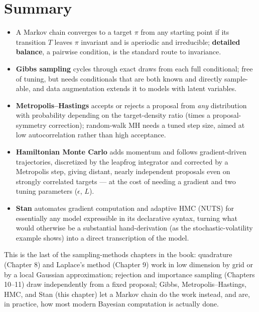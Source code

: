 \documentclass[
  letterpaper,
  DIV=11,
  numbers=noendperiod]{scrreprt}
\providecommand{\tightlist}{%
  \setlength{\itemsep}{0pt}\setlength{\parskip}{0pt}}
\begin{document}
\section{Summary}\label{summary-6}

\begin{itemize}
\tightlist
\item
  A Markov chain converges to a target \(\pi\) from any starting point
  if its transition \(T\) leaves \(\pi\) invariant and is aperiodic and
  irreducible; \textbf{detailed balance}, a pairwise condition, is the
  standard route to invariance.
\item
  \textbf{Gibbs sampling} cycles through exact draws from each full
  conditional; free of tuning, but needs conditionals that are both
  known and directly sample-able, and data augmentation extends it to
  models with latent variables.
\item
  \textbf{Metropolis--Hastings} accepts or rejects a proposal from
  \emph{any} distribution with probability depending on the
  target-density ratio (times a proposal-symmetry correction);
  random-walk MH needs a tuned step size, aimed at low autocorrelation
  rather than high acceptance.
\item
  \textbf{Hamiltonian Monte Carlo} adds momentum and follows
  gradient-driven trajectories, discretized by the leapfrog integrator
  and corrected by a Metropolis step, giving distant, nearly independent
  proposals even on strongly correlated targets --- at the cost of
  needing a gradient and two tuning parameters (\(\epsilon\), \(L\)).
\item
  \textbf{Stan} automates gradient computation and adaptive HMC (NUTS)
  for essentially any model expressible in its declarative syntax,
  turning what would otherwise be a substantial hand-derivation (as the
  stochastic-volatility example shows) into a direct transcription of
  the model.
\end{itemize}

This is the last of the sampling-methods chapters in the book:
quadrature (Chapter 8) and Laplace's method (Chapter 9) work in low
dimension by grid or by a local Gaussian approximation; rejection and
importance sampling (Chapters 10--11) draw independently from a fixed
proposal; Gibbs, Metropolis--Hastings, HMC, and Stan (this chapter) let
a Markov chain do the work instead, and are, in practice, how most
modern Bayesian computation is actually done.
\end{document}
